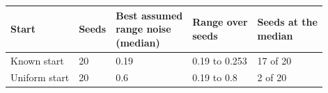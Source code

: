 \begin{tabular}{lllll}
\toprule
Start & Seeds & \shortstack[l]{Best assumed\\range noise\\(median)} & \shortstack[l]{Range over\\seeds} & \shortstack[l]{Seeds at the\\median} \\
\midrule
Known start & 20 & 0.19 & 0.19 to 0.253 & 17 of 20 \\
Uniform start & 20 & 0.6 & 0.19 to 0.8 & 2 of 20 \\
\bottomrule
\end{tabular}
